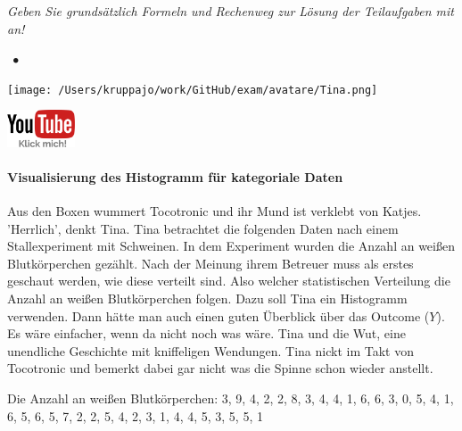 \documentclass[a4paper, 9pt]{scrartcl}\usepackage[]{graphicx}\usepackage[]{xcolor}
\begin{document}
\textit{Geben Sie grundsätzlich Formeln und Rechenweg zur Lösung der Teilaufgaben mit an!} \\[1Ex]
 

 
\ifcollection
\begin{flushright}
\tiny\vspace{-3Ex}
\textbf{\examinhaltstart}
\exammodulestatversuch $\;\bullet$
\exammodulebiostat
\vspace{-4Ex}
\end{flushright}
\begin{minipage}[t]{0.5\textwidth}
\texttt{[image: /Users/kruppajo/work/GitHub/exam/avatare/Tina.png]}
\end{minipage}
\begin{minipage}[t]{0.5\textwidth}
\hfill
\href{https://youtu.be/aXvxGC4YLqk}{\includegraphics[width = 2cm]{img/youtube}}
\end{minipage}
\vspace{-3ex}
\fi



\ifcollection
\paragraph{Visualisierung des Histogramm für kategoriale Daten}
\fi

Aus den Boxen wummert Tocotronic und ihr Mund ist verklebt von Katjes. 'Herrlich', denkt Tina. Tina betrachtet die folgenden Daten nach einem Stallexperiment mit Schweinen. In dem Experiment wurden die Anzahl an weißen Blutkörperchen gezählt. Nach der Meinung ihrem Betreuer muss als erstes geschaut werden, wie diese verteilt sind. Also welcher statistischen Verteilung die Anzahl an weißen Blutkörperchen folgen. Dazu soll Tina ein Histogramm verwenden. Dann hätte man auch einen guten Überblick über das Outcome ($Y$). Es wäre einfacher, wenn da nicht noch was wäre. Tina und die Wut, eine unendliche Geschichte mit kniffeligen Wendungen. Tina nickt im Takt von Tocotronic und bemerkt dabei gar nicht was die Spinne schon wieder anstellt.

\begin{center}
Die Anzahl an weißen Blutkörperchen: 3, 9, 4, 2, 2, 8, 3, 4, 4, 1, 6, 6, 3, 0, 5, 4, 1, 6, 5, 6, 5, 7, 2, 2, 5, 4, 2, 3, 1, 4, 4, 5, 3, 5, 5, 1
\end{center}
\end{document}
